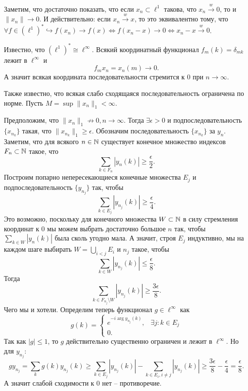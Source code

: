 \begin{solution}
    Заметим, что достаточно показать, что если $x_n \subset \ell^1$ такова, что $x_n \xrightarrow{w} 0$, то и $\|x_n\| \rightarrow 0$.
    И действительно: если $x_n \xrightarrow{w} x$, то это эквивалентно тому, что $\forall f \in (\ell^1)^* \hookrightarrow f(x_n) \rightarrow f(x) \Longleftrightarrow f(x_n - x) \rightarrow 0 \Longleftrightarrow x_n - x \xrightarrow{w} 0$.

    Известно, что $(\ell^1)^* \cong \ell^\infty$.
    Всякий координатный функционал $f_m(k) = \delta_{mk}$ лежит в $\ell^{\infty}$ и
    \[
        f_m x_n = x_n(m) \rightarrow 0.
    \]
    А значит всякая координата последовательности стремится к $0$ при $n \rightarrow \infty$.

    Также известно, что всякая слабо сходящаяся последовательность ограничена по норме.
    Пусть $M = \sup \|x_n\|_1 < \infty$.

    Предположим, что $\|x_n\|_1 \not\rightarrow 0, n \rightarrow \infty$.
    Тогда $\exists \epsilon > 0$ и подпоследовательность $\{x_{n_k}\}$ такая, что $\|x_{n_k}\|_1 \geq \epsilon$.
    Обозначим последовательность $\{x_{n_k}\}$ за $y_n$.
    Заметим, что для всякого $n \in \mathbb{N}$ существует конечное множество индексов $F_n \subset \mathbb{N}$ такое, что
    \[
        \sum_{k \in F_n} |y_n(k)| \geq \frac{\epsilon}{2}.
    \]
    Построим попарно непересекающиеся конечные множества $E_j$ и подпоследовательность $\{y_{n_j}\}$ так, чтобы
    \[
        \sum_{k \in E_j} |y_{n_j}(k)| \geq \frac{\epsilon}{4}.
    \]
    Это возможно, поскольку для конечного множества $W \subset \mathbb{N}$ в силу стремления координат к 0 мы можем выбрать достаточно большое $n$ так, чтобы $\sum_{k \in W} |y_{n}(k)|$ была сколь угодно мала.
    А значит, строя $E_j$ индуктивно, мы на каждом шаге выбирать $W = \bigcup_{i < j} E_i$ и $n_j$ такое, чтобы
    \[
        \sum_{k \in W} |y_{n_j}(k)| \leq \frac{\epsilon}{8}.
    \]
    Тогда
    \[
        \sum_{k \in F_{n_j} \setminus W} |y_{n_j}(k)| \geq \frac{3\epsilon}{8}.
    \]
    Чего мы и хотели.
    Определим теперь функционал $g \in \ell^\infty$ как
    \[
        g(k) = \begin{cases}
                   e^{-i\arg y_{n_j}(k)}, & \exists j\colon k \in E_j \\
                   0.
        \end{cases}
    \]
    Так как $|g| \leq 1$, то $g$ действительно существенно ограничен и лежит в $\ell^{\infty}$.
    Но для $y_{n_j}\colon$
    \[
        g y_{n_j} = \sum_{k} g(k) y_{n_j}(k) \geq \sum_{k \in E_j} |y_{n_j}(k)| - \sum_{k \in E_i, i \neq j} |y_{n_j}(k)| \geq \frac{3\epsilon}{8} - \frac{\epsilon}{4} = \frac{\epsilon}{8}.
    \]
    А значит слабой сходимости к $0$ нет -- противоречие.
\end{solution}

